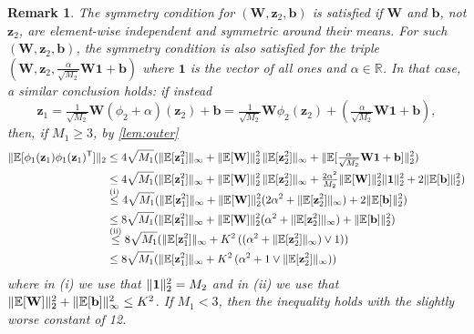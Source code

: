 \documentclass[twoside]{article}
\newcommand{\vb}{\mathbf{b}}
\newcommand{\vz}{\mathbf{z}}
\newcommand{\vone}{\mathbf{1}}
\newcommand{\mW}{\mathbf{W}}
\newcommand{\E}{\mathbb{E}}
\newcommand{\R}{\mathbb{R}}
\newcommand{\T}{\text{\textsf{T}}}
\DeclarePairedDelimiter\norm{\|}{\|}             %
\theoremstyle{theoremstyle}
\newtheorem{remark}[theorem]{Remark}
\begin{document}
\begin{remark} \label{rem:outer_offset}
    The symmetry condition for $(\mW, \vz_2, \vb)$ is satisfied if $\mW$ and $\vb$, not $\vz_2$, are element-wise independent and symmetric around their means.
    For such $(\mW, \vz_2, \vb)$, the symmetry condition is also satisfied for the triple $(\mW, \vz_2, \tfrac{\alpha}{\sqrt{M_2}} \mW \vone + \vb)$
    where $\vone$ is the vector of all ones and $\alpha \in \R$.
    In that case, a similar conclusion holds:
    if instead
    \begin{equation}
        \vz_1
            = \tfrac1{\sqrt{M_2}}\mW (\phi_2 + \alpha)(\vz_2) + \vb
            = \tfrac1{\sqrt{M_2}}\mW \phi_2 (\vz_2) + (\tfrac{\alpha}{\sqrt{M_2}} \mW \vone + \vb),
    \end{equation}
    then, if $M_1\ge 3$, by \cref{lem:outer} 
    \begin{align}
        \norm{\E[\phi_1(\vz_1) \phi_1(\vz_1)^\T]}_2
        &\le
            4\sqrt{M_1}(
                \norm{\E[\vz_1^2]}_\infty
                + \norm{\E[\mW]}_2^2\, \norm{\E[\vz_{2}^2]}_\infty
                + \norm{\E[\tfrac{\alpha}{\sqrt{M_2}} \mW \vone + \vb]}_2^2
            )\\
        &\le
            4\sqrt{M_1}(
                \norm{\E[\vz_1^2]}_\infty
                + \norm{\E[\mW]}_2^2\, \norm{\E[\vz_{2}^2]}_\infty
                + \tfrac{2\alpha^2}{M_2} \norm{\E[\mW]}_2^2 \norm{\vone}_2^2 + 2\norm{\E[\vb]}_2^2
            )\\
        &\overset{\smash{\text{(i)}}}{\le}
            4\sqrt{M_1}(
                \norm{\E[\vz_1^2]}_\infty
                + \norm{\E[\mW]}_2^2 (2 \alpha^2 + \norm{\E[\vz_{2}^2]}_\infty) + 2\norm{\E[\vb]}_2^2
            )\\
        &\le
            8\sqrt{M_1}(
                \norm{\E[\vz_1^2]}_\infty
                + \norm{\E[\mW]}_2^2 (\alpha^2 + \norm{\E[\vz_{2}^2]}_\infty) + \norm{\E[\vb]}_2^2
            )\\
        &\overset{\smash{\text{(ii)}}}{\le}
            8\sqrt{M_1}(
                \norm{\E[\vz_1^2]}_\infty
                + K^2\, ((\alpha^2 +  \norm{\E[\vz_{2}^2]}_\infty) \lor 1)
            ) \\
        &\le
            8\sqrt{M_1}(
                \norm{\E[\vz_1^2]}_\infty
                + K^2\, (\alpha^2 + 1 \lor \norm{\E[\vz_{2}^2]}_\infty)
            )
    \end{align}
    where in (i) we use that $\norm{\vone}_2^2 = M_2$ and in (ii) we use that $\norm{\E[\mW]}_2^2 + \norm{\E[\vb]}_\infty^2 \le K^2$. If $M_1<3$, then the inequality holds with the slightly worse constant of 12. 
\end{remark}
\end{document}

